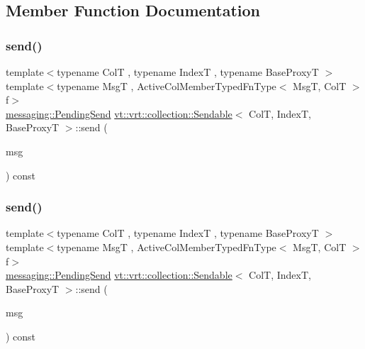 \subsection{Member Function Documentation}
\mbox{\label{structvt_1_1vrt_1_1collection_1_1_sendable_a321d85ceafaf6525875fb7468a80ac6d}} 
\subsubsection{\texorpdfstring{send()}{send()}\hspace{0.1cm}{\footnotesize\ttfamily [1/6]}}
{\footnotesize\ttfamily template$<$typename ColT , typename IndexT , typename Base\+ProxyT $>$ \\
template$<$typename MsgT , Active\+Col\+Member\+Typed\+Fn\+Type$<$ Msg\+T, Col\+T $>$ f$>$ \\
\hyperlink{structvt_1_1messaging_1_1_pending_send}{messaging\+::\+Pending\+Send} \hyperlink{structvt_1_1vrt_1_1collection_1_1_sendable}{vt\+::vrt\+::collection\+::\+Sendable}$<$ ColT, IndexT, Base\+ProxyT $>$\+::send (\begin{DoxyParamCaption}\item[{MsgT $\ast$}]{msg }\end{DoxyParamCaption}) const}

\mbox{\label{structvt_1_1vrt_1_1collection_1_1_sendable_aa8c102820895d01422c14e8c0993fc90}} 
\subsubsection{\texorpdfstring{send()}{send()}\hspace{0.1cm}{\footnotesize\ttfamily [2/6]}}
{\footnotesize\ttfamily template$<$typename ColT , typename IndexT , typename Base\+ProxyT $>$ \\
template$<$typename MsgT , Active\+Col\+Member\+Typed\+Fn\+Type$<$ Msg\+T, Col\+T $>$ f$>$ \\
\hyperlink{structvt_1_1messaging_1_1_pending_send}{messaging\+::\+Pending\+Send} \hyperlink{structvt_1_1vrt_1_1collection_1_1_sendable}{vt\+::vrt\+::collection\+::\+Sendable}$<$ ColT, IndexT, Base\+ProxyT $>$\+::send (\begin{DoxyParamCaption}\item[{\hyperlink{namespacevt_ab2b3d506ec8e8d1540aede826d84a239}{Msg\+Shared\+Ptr}$<$ MsgT $>$}]{msg }\end{DoxyParamCaption}) const}

